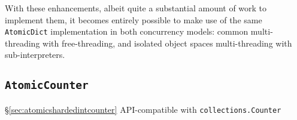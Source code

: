 With these enhancements, albeit quite a substantial amount of work to implement them, it becomes entirely possible to make use of the same \texttt{AtomicDict} implementation in both concurrency models: common multi-threading with free-threading, and isolated object spaces multi-threading with sub-interpreters.


\subsection{\texttt{AtomicCounter}}\label{subsec:atomiccounter}
\S\ref{sec:atomicshardedintcounter}
API-compatible with \texttt{collections.Counter}
